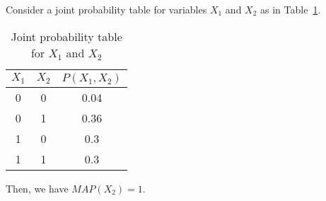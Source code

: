 \begin{example}
Consider a joint probability table for variables $X_1$ and $X_2$ as in Table~\ref{tab:tableforx1x2}. 
\begin{table}[!htbp]
    \centering
    \begin{tabular}{|c|c|c|}
    \hline
        $X_1$ & $X_2$ & $P(X_1,X_2)$ \\
        \hline
        0 & 0 & 0.04\\
        0 & 1 & 0.36 \\
        1 & 0 & 0.3 \\
        1 & 1 & 0.3\\
        \hline
    \end{tabular}
    \caption{Joint probability table for $X_1$ and $X_2$}
    \label{tab:tableforx1x2}
\end{table}

Then, we have $MAP(X_2)=1$. 
\end{example}



